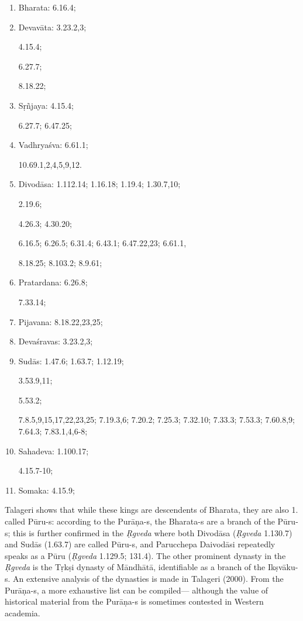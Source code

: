 \begin{enumerate}
\itemsep=0pt
\item Bharata: 6.16.4;
\item Devavāta: 3.23.2,3; 

4.15.4; 

6.27.7; 

8.18.22;

\item Sṛñjaya: 4.15.4; 

6.27.7; 6.47.25;
\item Vadhryaśva:  6.61.1; 

10.69.1,2,4,5,9,12. 
\item Divodāsa: 1.112.14; 1.16.18; 1.19.4; 1.30.7,10; 

2.19.6; 

4.26.3; 4.30.20; 

6.16.5; 6.26.5; 6.31.4; 6.43.1; 6.47.22,23; 6.61.1,

8.18.25; 8.103.2; 8.9.61;

\item Pratardana: 6.26.8; 

7.33.14;

\item Pijavana: 8.18.22,23,25;

\item Devaśravas: 3.23.2,3;

\item Sudās: 1.47.6; 1.63.7; 1.12.19;

3.53.9,11;

5.53.2;

7.8.5,9,15,17,22,23,25; 7.19.3,6; 7.20.2; 7.25.3; 7.32.10; 7.33.3; 7.53.3; 7.60.8,9; 7.64.3; 7.83.1,4,6-8; 

\item Sahadeva: 1.100.17;

4.15.7-10;
\item Somaka: 4.15.9;
\end{enumerate}

Talageri shows that while these kings are descendents of Bharata, they are also 1. called Pūru-s: according to the Purāṇa-s, the \hbox{Bharata-s} are a branch of the Pūru-s; this is further confirmed in the {\sl Ṛgveda} where both Divodāsa ({\sl Ṛgveda} 1.130.7) and Sudās (1.63.7) are called Pūru-s, and Parucchepa Daivodāsi repeatedly speaks as a Pūru ({\sl Ṛgveda} 1.129.5; 131.4). The other prominent dynasty in the {\sl Ṛgveda} is the Tṛkṣi dynasty of Māndhātā, identifiable as a branch of the Ikṣvāku-s. An extensive analysis of the dynasties is made in Talageri (2000). From the Purāṇa-s, a more exhaustive list can be compiled--- although the value of historical material from the Purāṇa-s is sometimes contested in Western academia.

